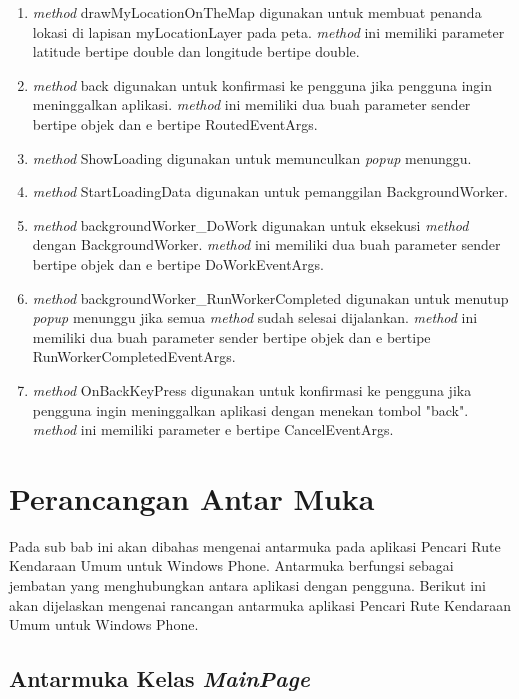 \begin{enumerate}
	\item \textit{method} drawMyLocationOnTheMap digunakan untuk membuat penanda lokasi di lapisan myLocationLayer pada peta. \textit{method} ini memiliki parameter latitude bertipe double dan longitude bertipe double.
	\item \textit{method} back digunakan untuk konfirmasi ke pengguna jika pengguna ingin meninggalkan aplikasi. \textit{method} ini memiliki dua buah parameter sender bertipe objek dan e bertipe RoutedEventArgs.
	\item \textit{method} ShowLoading digunakan untuk memunculkan \textit{popup} menunggu.
	\item \textit{method} StartLoadingData digunakan untuk pemanggilan BackgroundWorker.
	\item \textit{method} backgroundWorker\_DoWork digunakan untuk eksekusi \textit{method} dengan BackgroundWorker. \textit{method} ini memiliki dua buah parameter sender bertipe objek dan e bertipe DoWorkEventArgs.
	\item \textit{method} backgroundWorker\_RunWorkerCompleted digunakan untuk menutup \textit{popup} menunggu jika semua \textit{method} sudah selesai dijalankan. \textit{method} ini memiliki dua buah parameter sender bertipe objek dan e bertipe RunWorkerCompletedEventArgs.
	\item \textit{method} OnBackKeyPress digunakan untuk konfirmasi ke pengguna jika pengguna ingin meninggalkan aplikasi dengan menekan tombol "back". \textit{method} ini memiliki parameter e bertipe CancelEventArgs.
\end{enumerate}

\section{Perancangan Antar Muka}
\label{lab:Perancangan Kelas}
\hspace{0.5cm} Pada sub bab ini akan dibahas mengenai antarmuka pada aplikasi Pencari Rute Kendaraan Umum untuk Windows Phone. Antarmuka berfungsi sebagai jembatan yang menghubungkan antara aplikasi dengan pengguna. Berikut ini akan dijelaskan mengenai rancangan antarmuka aplikasi Pencari Rute Kendaraan Umum untuk Windows Phone. 

\subsection{Antarmuka Kelas \textit{MainPage}}
\label{lab:Antarmuka Kelas MainPage}


